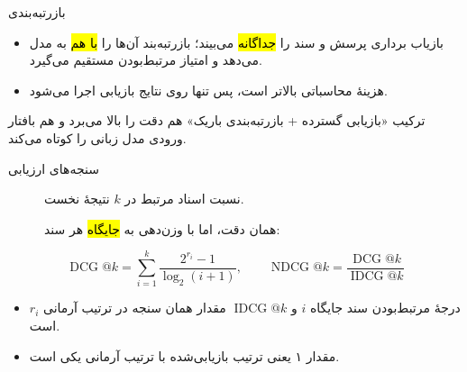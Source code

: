 \begin{frame}{بازرتبه‌بندی}{}
  \begin{itemize}
    \item بازیاب برداری پرسش و سند را \hl{جداگانه} می‌بیند؛ بازرتبه‌بند آن‌ها را
          \hl{با هم} به مدل می‌دهد و امتیاز مرتبط‌بودن مستقیم می‌گیرد.
    \item هزینهٔ محاسباتی بالاتر است، پس تنها روی  نتایج
          بازیابی اجرا می‌شود.
  \end{itemize}

  \begin{PTresult}
    ترکیب «بازیابی گسترده + بازرتبه‌بندی باریک» هم دقت را بالا می‌برد و هم بافتار
    ورودی مدل زبانی را کوتاه می‌کند.
  \end{PTresult}
\end{frame}

\begin{frame}{سنجه‌های ارزیابی}
  \begin{description}
    \item[] نسبت اسناد مرتبط در \(k\) نتیجهٔ نخست.
    \item[] همان دقت، اما با وزن‌دهی به \hl{جایگاه} هر سند:
  \end{description}
  \[
    \operatorname{DCG}@k=\sum_{i=1}^{k}\frac{2^{r_i}-1}{\log_2(i+1)},
    \qquad
    \operatorname{NDCG}@k=\frac{\operatorname{DCG}@k}{\operatorname{IDCG}@k}
  \]
  \begin{itemize}
    \item \(r_i\) درجهٔ مرتبط‌بودن سند جایگاه \(i\) و \(\operatorname{IDCG}@k\)
          مقدار همان سنجه در ترتیب آرمانی است.
    \item مقدار ۱ یعنی ترتیب بازیابی‌شده با ترتیب آرمانی یکی است.
  \end{itemize}
\end{frame}
